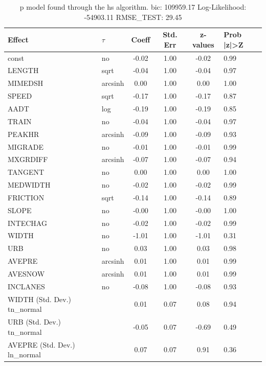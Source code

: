 \begin{table}
	\caption{p model found through the hs algorithm. bic: 109959.17 Log-Likelihood: -54903.11 RMSE_TEST: 29.45}
	\begin{center}
		\begin{tabular}{|l|l|c|c|c|l|}
			\hline
			Effect & $\tau$ & Coeff & Std. Err & z-values & Prob |z|>Z \\
			\hline
			const & no & -0.02 & 1.00 & -0.02 & 0.99 \\
			\hline
			LENGTH & sqrt & -0.04 & 1.00 & -0.04 & 0.97 \\
			\hline
			MIMEDSH & arcsinh & 0.00 & 1.00 & 0.00 & 1.00 \\
			\hline
			SPEED & sqrt & -0.17 & 1.00 & -0.17 & 0.87 \\
			\hline
			AADT & log & -0.19 & 1.00 & -0.19 & 0.85 \\
			\hline
			TRAIN & no & -0.04 & 1.00 & -0.04 & 0.97 \\
			\hline
			PEAKHR & arcsinh & -0.09 & 1.00 & -0.09 & 0.93 \\
			\hline
			MIGRADE & no & -0.01 & 1.00 & -0.01 & 0.99 \\
			\hline
			MXGRDIFF & arcsinh & -0.07 & 1.00 & -0.07 & 0.94 \\
			\hline
			TANGENT & no & 0.00 & 1.00 & 0.00 & 1.00 \\
			\hline
			MEDWIDTH & no & -0.02 & 1.00 & -0.02 & 0.99 \\
			\hline
			FRICTION & sqrt & -0.14 & 1.00 & -0.14 & 0.89 \\
			\hline
			SLOPE & no & -0.00 & 1.00 & -0.00 & 1.00 \\
			\hline
			INTECHAG & no & -0.02 & 1.00 & -0.02 & 0.99 \\
			\hline
			WIDTH & no & -1.01 & 1.00 & -1.01 & 0.31 \\
			\hline
			URB & no & 0.03 & 1.00 & 0.03 & 0.98 \\
			\hline
			AVEPRE & arcsinh & 0.01 & 1.00 & 0.01 & 0.99 \\
			\hline
			AVESNOW & arcsinh & 0.01 & 1.00 & 0.01 & 0.99 \\
			\hline
			INCLANES & no & -0.08 & 1.00 & -0.08 & 0.93 \\
			\hline
			WIDTH (Std. Dev.) tn_normal &  & 0.01 & 0.07 & 0.08 & 0.94 \\
			\hline
			URB (Std. Dev.) tn_normal &  & -0.05 & 0.07 & -0.69 & 0.49 \\
			\hline
			AVEPRE (Std. Dev.) ln_normal &  & 0.07 & 0.07 & 0.91 & 0.36 \\

\end{tabular}
\end{center}
\end{table}

